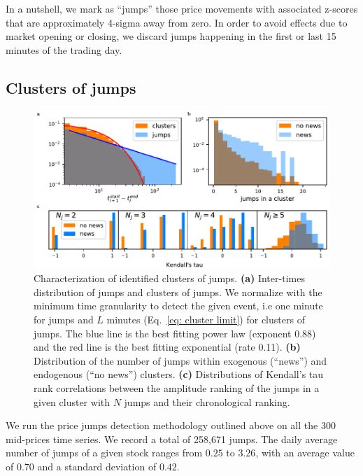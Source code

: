 \documentclass[amsmath,amssymb,aps,pre,floatfix,twocolumn,superscriptaddress]{revtex4}
\begin{document}
In a nutshell, we mark as ``jumps'' those price movements with associated z-scores that are approximately 4-sigma away from zero. In order to avoid effects due to market opening or closing, we discard jumps happening in the first or last 15 minutes of the trading day.

\subsection{Clusters of jumps}

\begin{figure}[t]
  \centering
  \includegraphics[width=0.85\linewidth]{fig1.pdf}
  \caption{Characterization of identified clusters of jumps. \textbf{(a)} Inter-times distribution of jumps and clusters of jumps. We normalize with the minimum time granularity to detect the given event, i.e one minute for jumps and $L$ minutes (Eq.~\ref{eq: cluster limit}) for clusters of jumps. The blue line is the best fitting power law (exponent 0.88) and the red line is the best fitting exponential (rate 0.11). \textbf{(b)} Distribution of the number of jumps within exogenous (\textquotedblleft news\textquotedblright) and endogenous (\textquotedblleft no news\textquotedblright) clusters. \textbf{(c)} Distributions of Kendall's tau rank correlations between the amplitude ranking of the jumps in a given cluster with $N$ jumps and their  chronological ranking. }  
  \label{fig: cluster 1}
\end{figure}

We run the price jumps detection methodology outlined above on all the 300 mid-prices time series. We record a total of 258,671 jumps. The daily average number of jumps of a given stock ranges from $0.25$ to $3.26$, with an average value of $0.70$ and a standard deviation of $0.42$.  
\end{document}
